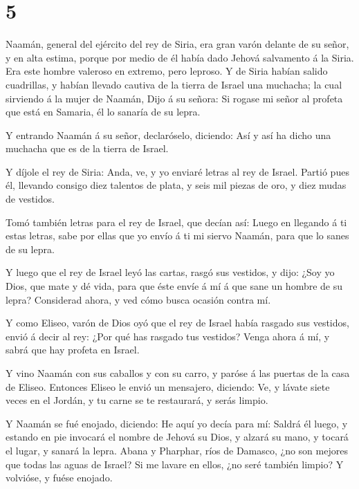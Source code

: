 \hypertarget{section-4}{%
\section{5}\label{section-4}}

 Naamán, general del ejército del rey de Siria, era gran
varón delante de su señor, y en alta estima, porque por medio de él
había dado Jehová salvamento á la Siria. Era este hombre valeroso en
extremo, pero leproso.  Y de Siria habían salido cuadrillas,
y habían llevado cautiva de la tierra de Israel una muchacha; la cual
sirviendo á la mujer de Naamán,  Dijo á su señora: Si rogase
mi señor al profeta que está en Samaria, él lo sanaría de su lepra.

 Y entrando Naamán á su señor, declaróselo, diciendo: Así y
así ha dicho una muchacha que es de la tierra de Israel.

 Y díjole el rey de Siria: Anda, ve, y yo enviaré letras al
rey de Israel. Partió pues él, llevando consigo diez talentos de plata,
y seis mil piezas de oro, y diez mudas de vestidos.

 Tomó también letras para el rey de Israel, que decían así:
Luego en llegando á ti estas letras, sabe por ellas que yo envío á ti mi
siervo Naamán, para que lo sanes de su lepra.

 Y luego que el rey de Israel leyó las cartas, rasgó sus
vestidos, y dijo: ¿Soy yo Dios, que mate y dé vida, para que éste envíe
á mí á que sane un hombre de su lepra? Considerad ahora, y ved cómo
busca ocasión contra mí.

 Y como Eliseo, varón de Dios oyó que el rey de Israel había
rasgado sus vestidos, envió á decir al rey: ¿Por qué has rasgado tus
vestidos? Venga ahora á mí, y sabrá que hay profeta en Israel.

 Y vino Naamán con sus caballos y con su carro, y paróse á
las puertas de la casa de Eliseo.  Entonces Eliseo le envió
un mensajero, diciendo: Ve, y lávate siete veces en el Jordán, y tu
carne se te restaurará, y serás limpio.

 Y Naamán se fué enojado, diciendo: He aquí yo decía para
mí: Saldrá él luego, y estando en pie invocará el nombre de Jehová su
Dios, y alzará su mano, y tocará el lugar, y sanará la lepra.
 Abana y Pharphar, ríos de Damasco, ¿no son mejores que
todas las aguas de Israel? Si me lavare en ellos, ¿no seré también
limpio? Y volvióse, y fuése enojado.

